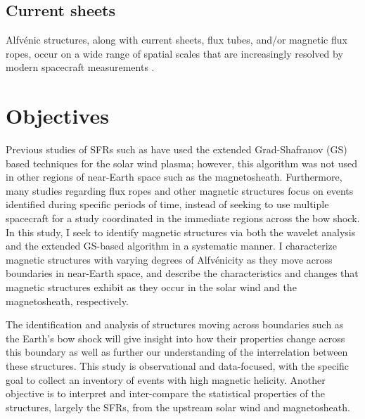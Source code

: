 \subsection{Current sheets}
Alfv\'enic structures, along with current sheets, flux tubes, and/or magnetic flux ropes, occur on a wide range of spatial scales that are increasingly resolved by modern spacecraft measurements \citep{Greco:2018, Pecora:2019, Zheng:2018, Artemyev:2019}.

\section{Objectives}
Previous studies of SFRs such as \cite{Chen:2022} have used the extended Grad-Shafranov (GS) based techniques for the solar wind plasma; however, this algorithm was not used in other regions of near-Earth space such as the magnetosheath. Furthermore, many studies regarding flux ropes and other magnetic structures \citep{Zhao:2020, Chen:2021} focus on events identified during specific periods of time, instead of seeking to use multiple spacecraft for a study coordinated in the immediate regions across the bow shock. In this study, I seek to identify magnetic structures via both the wavelet analysis and the extended GS-based algorithm in a systematic manner. I characterize magnetic structures with varying degrees of Alfv\'enicity as they move across boundaries in near-Earth space, and describe the characteristics and changes that magnetic structures exhibit as they occur in the solar wind and the magnetosheath, respectively.  

The identification and analysis of structures moving across boundaries such as the Earth's bow shock will give insight into how their properties change across this boundary as well as further our understanding of the interrelation between these structures. This study is observational and data-focused, with the specific goal to collect an inventory of events with high magnetic helicity. Another objective is to interpret and inter-compare the statistical properties of the structures, largely the SFRs, from the upstream solar wind and magnetosheath.
